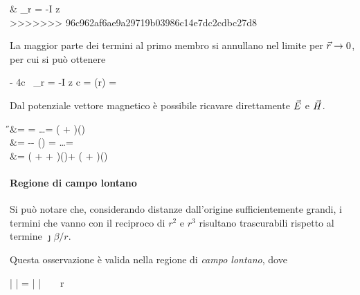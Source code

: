\begin{esp*}
	& \lim_{r } 
	= -\mu I \Delta z \\
>>>>>>> 96c962af6ae9a29719b03986c14e7dc2cdbc27d8
\end{esp*}
La maggior parte dei termini al primo membro si annullano nel limite per $\vec{r} \to 0$, per cui si può ottenere
\begin{esp} \label{eq:A_DE}
	- 4\pi c \, \lim_{r } \ejbrp = -\mu I \Delta z
	\implies c = 
	\implies \A(r) =   \hz
\end{esp}

Dal potenziale vettore magnetico è possibile ricavare direttamente $\vec{E}$ e $\vec{H}$.

\begin{esp}\label{eq:campoDE}
	\H &=  \rot \A = \ldots =  \left( + \right)\ejbr \sin(\theta)\hphi\\
	\E &= -\jmath\omega\A - \nabla \left(\frac{\diverg\A}{-\jmath\omega\mu\epsilon}\right) = \ldots = \\
	&= \eta {} \left( +  + \right)\ejbrp \sin(\theta)\hth +
	\eta {} \left(  + \right)\ejbr \cos(\theta)\hr
\end{esp}

\paragraph{Regione di campo lontano}
Si può notare che, considerando distanze dall'origine sufficientemente grandi, i termini che vanno con il reciproco di $r^2$ e $r^3$ risultano trascurabili rispetto al termine $\jmath \beta / r$.

Questa osservazione è valida nella regione di \emph{campo lontano}, dove
\begin{esp*}
	\left|  \right|
	= \left|  \right|
	\gg {} ~ \Leftrightarrow ~ r \gg \lambda
\end{esp*}

